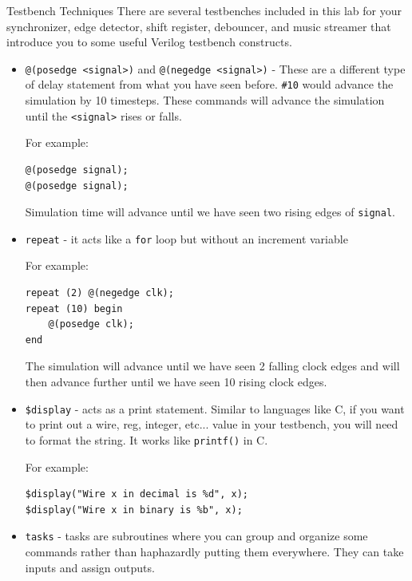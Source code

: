 \documentclass[11pt]{article}
\makeatletter
\renewcommand{\section}
{\@startsection {section}{1}{0pt}
 {-2ex}
 {1ex}
 {\bfseries\Large}}
\makeatother
\begin{document}
\section{Testbench Techniques} \label{sec:testbenchtechniques}
There are several testbenches included in this lab for your synchronizer, edge detector, shift register, debouncer, and music streamer that introduce you to some useful Verilog testbench constructs.

\begin{itemize}
\item \verb|@(posedge <signal>)| and \verb|@(negedge <signal>)| - These are a different type of delay statement from what you have seen before. \verb|#10| would advance the simulation by 10 timesteps. These commands will advance the simulation until the \verb|<signal>| rises or falls.

For example:
\begin{verbatim}
@(posedge signal);
@(posedge signal);
\end{verbatim}

Simulation time will advance until we have seen two rising edges of \verb|signal|.

\item \verb|repeat| - it acts like a \verb|for| loop but without an increment variable

For example:
\begin{verbatim}
repeat (2) @(negedge clk);
repeat (10) begin 
	@(posedge clk);
end
\end{verbatim} 

The simulation will advance until we have seen 2 falling clock edges and will then advance further until we have seen 10 rising clock edges.

\item \verb|$display| - acts as a print statement. Similar to languages like C, if you want to print out a wire, reg, integer, etc... value in your testbench, you will need to format the string. It works like \verb|printf()| in C.

For example:
\begin{verbatim}
$display("Wire x in decimal is %d", x);
$display("Wire x in binary is %b", x);
\end{verbatim} 

\item \verb|tasks| - tasks are subroutines where you can group and organize some commands rather than haphazardly putting them everywhere. They can take inputs and assign outputs. 


\end{itemize}
\end{document}
